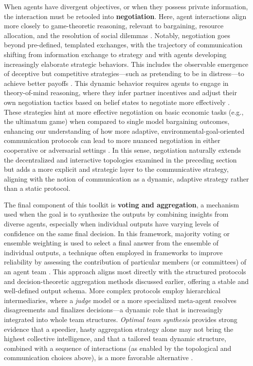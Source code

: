 \documentclass[11pt,a4paper]{article}
\begin{document}
When agents have divergent objectives, or when they possess private information, the interaction must be retooled into \textbf{negotiation}. Here, agent interactions align more closely to game-theoretic reasoning, relevant to bargaining, resource allocation, and the resolution of social dilemmas \cite{arxiv:2310.10701v2}. Notably, negotiation goes beyond pre-defined, templated exchanges, with the trajectory of communication shifting from information exchange to strategy and with agents developing increasingly elaborate strategic behaviors. This includes the observable emergence of deceptive but competitive strategies---such as pretending to be in distress---to achieve better payoffs \cite{arxiv:2402.04559v2}. This dynamic behavior requires agents to engage in theory-of-mind reasoning, where they infer partner incentives and adjust their own negotiation tactics based on belief states to negotiate more effectively \cite{arxiv:2310.10701v2}. These strategies hint at more effective negotiation on basic economic tasks (e.g., the ultimatum game) when compared to single model bargaining outcomes, enhancing our understanding of how more adaptive, environmental-goal-oriented communication protocols can lead to more nuanced negotiation in either cooperative or adversarial settings \cite{arxiv:2402.08189v1}. In this sense, negotiation naturally extends the decentralized and interactive topologies examined in the preceding section but adds a more explicit and strategic layer to the communicative strategy, aligning with the notion of communication as a dynamic, adaptive strategy rather than a static protocol.

The final component of this toolkit is \textbf{voting and aggregation}, a mechanism used when the goal is to synthesize the outputs by combining insights from diverse agents, especially when individual outputs have varying levels of confidence on the same final decision. In this framework, majority voting or ensemble weighting is used to select a final answer from the ensemble of individual outputs, a technique often employed in frameworks to improve reliability by assessing the contribution of particular members (or committees) of an agent team \cite{arxiv:2310.02170v1}. This approach aligns most directly with the structured protocols and decision-theoretic aggregation methods discussed earlier, offering a stable and well-defined output schema. More complex protocols employ hierarchical intermediaries, where a \emph{judge} model or a more specialized meta-agent resolves disagreements and finalizes decisions---a dynamic role that is increasingly integrated into whole team structures. \emph{Optimal team synthesis} provides strong evidence that a speedier, hasty aggregation strategy alone may not bring the highest collective intelligence, and that a tailored team dynamic structure, combined with a sequence of interactions (as enabled by the topological and communication choices above), is a more favorable alternative \cite{arxiv:2310.02170v1}.
\end{document}
